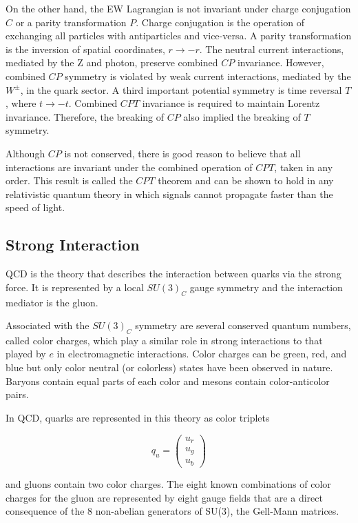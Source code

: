 On the other hand, the EW Lagrangian is not invariant under charge conjugation $C$ or a parity transformation $P$. Charge conjugation is the operation of exchanging all particles with antiparticles and vice-versa. A parity transformation is the inversion of spatial coordinates, $r\rightarrow -r$. The neutral current interactions, mediated by the Z and photon, preserve combined $CP$ invariance. However, combined $CP$ symmetry is violated by weak current interactions, mediated by the $W^{\pm}$, in the quark sector. A third important potential symmetry is time reversal $T$, where $t\rightarrow -t$. Combined $CPT$ invariance is required to maintain Lorentz invariance. Therefore, the breaking of $CP$ also implied the breaking of $T$ symmetry.

Although $CP$ is not conserved, there is good reason to believe that all interactions are invariant under the combined operation of $CPT$, taken in any order. This result is called the $CPT$ theorem\cite{PhysRev.82.914} and can be shown to hold in any relativistic quantum theory in which signals cannot propagate faster than the speed of light.

\subsection{Strong Interaction\label{strongint}}


QCD is the theory that describes the interaction between quarks via the strong force. It is represented by a local $SU(3)_{C}$ gauge symmetry and the interaction mediator is the gluon.

Associated with the $SU(3)_{C}$ symmetry are several conserved quantum numbers, called color charges, which play a similar role in strong interactions to that played by $e$ in electromagnetic interactions. Color charges can be green, red, and blue but only color neutral (or colorless) states have been observed in nature. Baryons contain equal parts of each color and mesons contain color-anticolor pairs.

In QCD, quarks are represented in this theory as color triplets

	\begin{equation}
	q_{u} = 
	\begin{pmatrix}
		u_{r} \\
		u_{g}\\
		u_{b}
	\end{pmatrix}
	\end{equation}

and gluons contain two color charges. The eight known combinations of color charges for the gluon are represented by eight gauge fields that are a direct consequence of the 8 non-abelian generators of SU(3), the Gell-Mann matrices\cite{Cheng:1985bj}.

